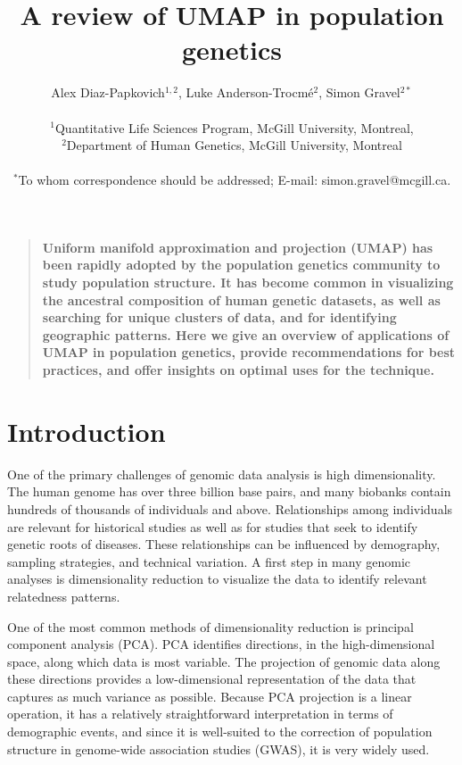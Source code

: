 \documentclass[12pt]{article}
\title{A review of UMAP in population genetics}
\author
{Alex Diaz-Papkovich$^{1,2}$, Luke Anderson-Trocm\'{e}$^{2}$, Simon Gravel$^{2\ast}$\\
\\
\normalsize{$^{1}$Quantitative Life Sciences Program, McGill University, Montreal,}\\
\normalsize{$^{2}$Department of Human Genetics, McGill University, Montreal}\\
\\
\normalsize{$^\ast$To whom correspondence should be addressed; E-mail:  simon.gravel@mcgill.ca.}
}
\date{}
\newenvironment{sciabstract}{%
\begin{quote} \bf}
{\end{quote}}
\begin{document}
 


\baselineskip24pt


\maketitle 



\begin{sciabstract}
Uniform manifold approximation and projection (UMAP) has been rapidly adopted by the population genetics community to study population structure. It has become common in visualizing the ancestral composition of human genetic datasets, as well as searching for unique clusters of data, and for identifying geographic patterns. Here we give an overview of applications of UMAP in population genetics, provide recommendations for best practices, and offer insights on optimal uses for the technique.
\end{sciabstract}

\section*{Introduction}
One of the primary challenges of genomic data analysis is high dimensionality. The human genome has over three billion base pairs, and many biobanks contain hundreds of thousands of individuals and above. Relationships among individuals are relevant for historical studies as well as for studies that seek to identify genetic roots of diseases. These relationships can be influenced by demography, sampling strategies, and technical variation. A first step in many genomic analyses is dimensionality reduction to visualize the data to identify relevant relatedness patterns. 

One of the most common methods of dimensionality reduction is principal component analysis (PCA). PCA identifies directions, in the high-dimensional space, along which data is most variable. The projection of genomic data along these directions provides a low-dimensional representation of the data that captures as much variance as possible. Because PCA projection is a linear operation, it has a relatively straightforward interpretation in terms of demographic events\cite{mcvean2009genealogical}, and since it is well-suited to the correction of population structure in genome-wide association studies (GWAS)\cite{patterson2006population}, it is very widely used.
\end{document}
